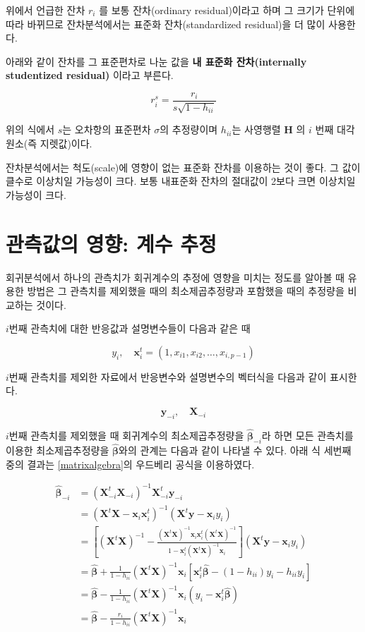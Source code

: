 \documentclass[
  10pt,
]{book}
\theoremstyle{definition}
\theoremstyle{definition}
\theoremstyle{definition}
\theoremstyle{definition}
\theoremstyle{remark}
\begin{document}
위에서 언급한 잔차 \(r_i\) 를 보통 잔차(ordinary residual)이라고 하며 그
크기가 단위에 따라 바뀌므로 잔차분석에서는 표준화 잔차(standardized
residual)을 더 많이 사용한다.

아래와 같이 잔차를 그 표준편차로 나눈 값을 \textbf{내 표준화 잔차(internally
studentized residual)} 이라고 부른다.

\begin{equation}
r^s_i = \frac{r_i}{s \sqrt{1-h_{ii}}} 
\label{eq:residinternal}
\end{equation}

위의 식에서 \(s\)는 오차항의 표준편차 \(\sigma\)의 추정량이며 \(h_{ii}\)는
사영행렬 \(\bm H\) 의 \(i\) 번째 대각원소(즉 지렛값)이다.

잔차분석에서는 척도(scale)에 영향이 없는 표준화 잔차를 이용하는 것이
좋다. 그 값이 클수로 이상치일 가능성이 크다. 보통 내표준화 잔차의
절대값이 2보다 크면 이상치일 가능성이 크다.

\hypertarget{uxad00uxce21uxac12uxc758-uxc601uxd5a5-uxacc4uxc218-uxcd94uxc815}{%
\section{관측값의 영향: 계수 추정}\label{uxad00uxce21uxac12uxc758-uxc601uxd5a5-uxacc4uxc218-uxcd94uxc815}}

회귀분석에서 하나의 관측치가 회귀계수의 추정에 영향을 미치는 정도를
알아볼 때 유용한 방법은 그 관측치를 제외했을 때의 최소제곱추정량과
포함했을 때의 추정량을 비교하는 것이다.

\(i\)번째 관측치에 대한 반응값과 설명변수들이 다음과 같은 때

\[ y_i, \quad \bm x_{i}^t=(1, x_{i1},x_{i2},\dots, x_{i,p-1}) \]

\(i\)번째 관측치를 제외한 자료에서 반응변수와 설명변수의 벡터식을 다음과
같이 표시한다.

\[ \bm y_{-i}, \quad \bm X_{-i} \]

\(i\)번째 관측치를 제외했을 때 회귀계수의 최소제곱추정량을
\(\hat{ \bm \beta}_{-i}\)라 하면 모든 관측치를 이용한 최소제곱추정량을
\(\hat{ \bm \beta}\)와의 관계는 다음과 같이 나타낼 수 있다. 아래 식 세번째
중의 결과는 \ref{matrixalgebra}의 우드베리 공식을 이용하였다.

\begin{align}
\hat{ \bm \beta}_{-i} & =  (\bm X_{-i}^t \bm X_{-i})^{-1} \bm X_{-i}^t \bm y_{-i}\\
& = (\bm X^t \bm X - \bm x_{i} \bm x_{i}^t)^{-1} (\bm X^t \bm y -  \bm x_{i} y_{i}) \\
& = \left [ (\bm X^t \bm X)^{-1} - \frac { (\bm X^t \bm X)^{-1}  \bm x_{i} \bm x_{i}^t
  (\bm X^t \bm X)^{-1}  }{ 1- \bm x_{i}^t (\bm X^t \bm X)^{-1}  \bm x_{i} } \right ]
(\bm X^t \bm y -  \bm x_{i} y_{i})  \\
& = \hat{ \bm \beta} + \frac{1}{1-h_{ii}} (\bm X^t \bm X)^{-1}  \bm x_i \left [ \bm x_i^t \hat{ \bm \beta} - (1-h_{ii}) y_i - h_{ii} y_i \right ] \\
& =  \hat{ \bm \beta} - \frac{1}{1-h_{ii}} (\bm X^t \bm X)^{-1}  \bm x_i ( y_i - \bm x_i^t \hat{ \bm \beta}) \\
& =  \hat{ \bm \beta} - \frac{r_i}{1-h_{ii}} (\bm X^t \bm X)^{-1}  \bm x_i 
\label{eq:betaminusi}
\end{align}
\end{document}
